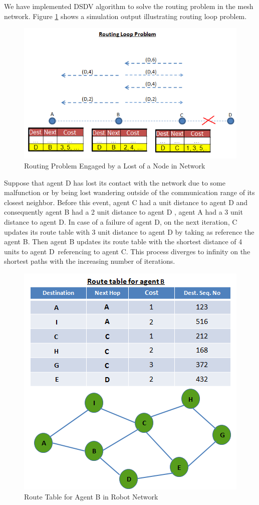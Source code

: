 We have implemented DSDV algorithm to solve the routing problem in the mesh network. Figure \ref{routing_problem2} shows a simulation output illustrating routing loop problem.

\begin{figure}[H] 
\caption{Routing Problem Engaged by a Lost of a Node in Network} \label{routing_problem2}
\centering
\includegraphics[scale = 0.60]{routing_problem}
\end{figure}

Suppose that agent D has lost its contact with the network due to some malfunction or by being lost wandering outside of the communication range of its closest neighbor. Before this event, agent C had a unit distance to agent D and consequently agent B had a 2 unit distance to agent D , agent A had a 3 unit distance to agent D. In case of a failure of agent D, on the next iteration, C updates its route table with 3 unit distance to agent D by taking as reference the agent B. Then agent B updates its route table with the shortest distance of 4 units to agent D\ referencing to agent C. This process diverges to infinity on the shortest paths with the increasing number of iterations. 

\begin{figure}[H]
\caption{Route Table for Agent B in Robot Network} \label{dest_seq_ref}
\centering
\includegraphics[scale = 0.70]{dest_seq}
\end{figure}

